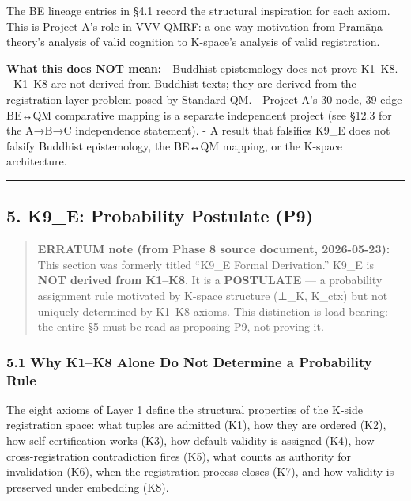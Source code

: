 \documentclass[
  11pt,
]{article}
\begin{document}
The BE lineage entries in §4.1 record the structural inspiration for
each axiom. This is Project A's role in VVV-QMRF: a one-way motivation
from Pramāṇa theory's analysis of valid cognition to K-space's analysis
of valid registration.

\textbf{What this does NOT mean:} - Buddhist epistemology does not prove
K1--K8. - K1--K8 are not derived from Buddhist texts; they are derived
from the registration-layer problem posed by Standard QM. - Project A's
30-node, 39-edge BE↔QM comparative mapping is a separate independent
project (see §12.3 for the A→B→C independence statement). - A result
that falsifies K9\_E does not falsify Buddhist epistemology, the BE↔QM
mapping, or the K-space architecture.

\begin{center}\rule{0.5\linewidth}{0.5pt}\end{center}

\subsection{5. K9\_E: Probability Postulate
(P9)}\label{k9_e-probability-postulate-p9}

\begin{quote}
\textbf{ERRATUM note (from Phase 8 source document, 2026-05-23):} This
section was formerly titled ``K9\_E Formal Derivation.'' K9\_E is
\textbf{NOT derived from K1--K8}. It is a \textbf{POSTULATE} --- a
probability assignment rule motivated by K-space structure (⊥\_K,
K\_ctx) but not uniquely determined by K1--K8 axioms. This distinction
is load-bearing: the entire §5 must be read as proposing P9, not proving
it.
\end{quote}

\subsubsection{5.1 Why K1--K8 Alone Do Not Determine a Probability
Rule}\label{why-k1k8-alone-do-not-determine-a-probability-rule}

The eight axioms of Layer 1 define the structural properties of the
K-side registration space: what tuples are admitted (K1), how they are
ordered (K2), how self-certification works (K3), how default validity is
assigned (K4), how cross-registration contradiction fires (K5), what
counts as authority for invalidation (K6), when the registration process
closes (K7), and how validity is preserved under embedding (K8).
\end{document}
